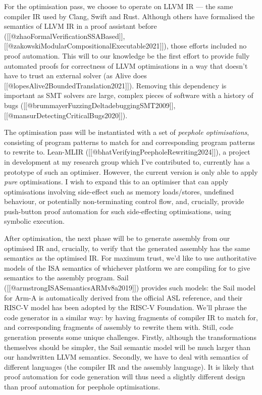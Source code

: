 For the optimisation pass, we choose to operate on LLVM IR --- the same
compiler IR used by Clang, Swift and Rust. Although others have
formalised the semantics of LLVM IR in a proof assistant before
({[}{[}@zhaoFormalVerificationSSABased{]}{]},
{[}{[}@zakowskiModularCompositionalExecutable2021{]}{]}), those efforts
included no proof automation. This will to our knowledge be the first
effort to provide fully automated proofs for correctness of LLVM
optimisations in a way that doesn't have to trust an external solver (as
Alive does {[}{[}@lopesAlive2BoundedTranslation2021{]}{]}). Removing
this dependency is important as SMT solvers are large, complex pieces of
software with a history of bugs
({[}{[}@brummayerFuzzingDeltadebuggingSMT2009{]}{]},
{[}{[}@mansurDetectingCriticalBugs2020{]}{]}).

The optimisation pass will be instantiated with a set of \emph{peephole
optimisations}, consisting of program patterns to match for and
corresponding program patterns to rewrite to. Lean-MLIR
({[}{[}@bhatVerifyingPeepholeRewriting2024{]}{]}), a project in
development at my research group which I've contributed to, currently
has a prototype of such an optimiser. However, the current version is
only able to apply \emph{pure} optimisations. I wish to expand this to
an optimiser that can apply optimisations involving side-effect such as
memory loads/stores, undefined behaviour, or potentially non-terminating
control flow, and, crucially, provide push-button proof automation for
such side-effecting optimisations, using symbolic execution.

After optimisation, the next phase will be to generate assembly from our
optimised IR and, crucially, to verify that the generated assembly has
the same semantics as the optimised IR. For maximum trust, we'd like to
use authoritative models of the ISA semantics of whichever platform we
are compiling for to give semantics to the assembly program. Sail
({[}{[}@armstrongISASemanticsARMv8a2019{]}{]}) provides such models: the
Sail model for Arm-A is automatically derived from the official ASL
reference, and their RISC-V model has been adopted by the RISC-V
Foundation. We'll phrase the code generator in a similar way: by having
fragments of compiler IR to match for, and corresponding fragments of
assembly to rewrite them with. Still, code generation presents some
unique challenges. Firstly, although the transformations themselves
should be simpler, the Sail semantic model will be much larger than our
handwritten LLVM semantics. Secondly, we have to deal with semantics of
different languages (the compiler IR and the assembly language). It is
likely that proof automation for code generation will thus need a
slightly different design than proof automation for peephole
optimisations.

